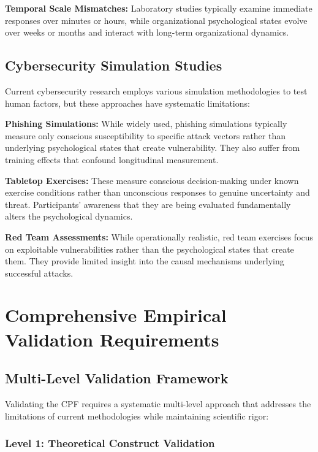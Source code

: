 \documentclass[11pt,a4paper]{article}
\begin{document}
\textbf{Temporal Scale Mismatches:} Laboratory studies typically examine immediate responses over minutes or hours, while organizational psychological states evolve over weeks or months and interact with long-term organizational dynamics.

\subsection{Cybersecurity Simulation Studies}

Current cybersecurity research employs various simulation methodologies to test human factors, but these approaches have systematic limitations:

\textbf{Phishing Simulations:} While widely used, phishing simulations typically measure only conscious susceptibility to specific attack vectors rather than underlying psychological states that create vulnerability. They also suffer from training effects that confound longitudinal measurement.

\textbf{Tabletop Exercises:} These measure conscious decision-making under known exercise conditions rather than unconscious responses to genuine uncertainty and threat. Participants' awareness that they are being evaluated fundamentally alters the psychological dynamics.

\textbf{Red Team Assessments:} While operationally realistic, red team exercises focus on exploitable vulnerabilities rather than the psychological states that create them. They provide limited insight into the causal mechanisms underlying successful attacks.

\section{Comprehensive Empirical Validation Requirements}

\subsection{Multi-Level Validation Framework}

Validating the CPF requires a systematic multi-level approach that addresses the limitations of current methodologies while maintaining scientific rigor:

\subsubsection{Level 1: Theoretical Construct Validation}
\end{document}
